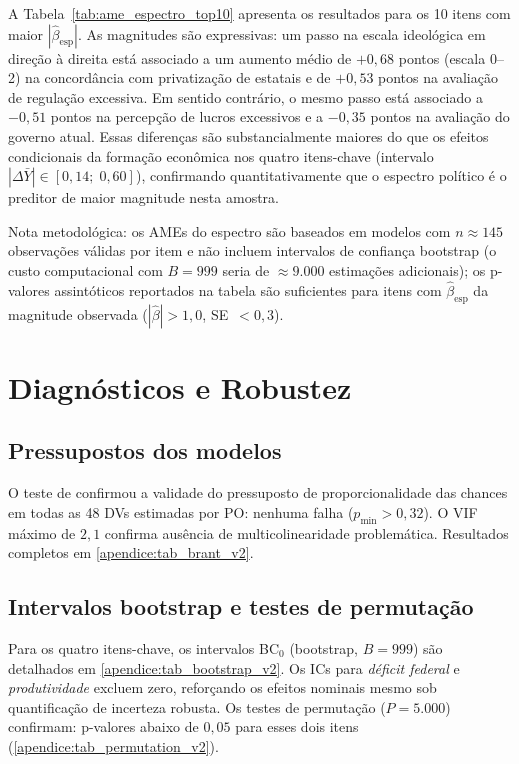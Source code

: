 A Tabela~\ref{tab:ame_espectro_top10} apresenta os resultados para os 10 itens com maior $|\hat{\beta}_{\text{esp}}|$. As magnitudes são expressivas: um passo na escala ideológica em direção à direita está associado a um aumento médio de $+0{,}68$ pontos (escala 0--2) na concordância com privatização de estatais e de $+0{,}53$ pontos na avaliação de regulação excessiva. Em sentido contrário, o mesmo passo está associado a $-0{,}51$ pontos na percepção de lucros excessivos e a $-0{,}35$ pontos na avaliação do governo atual. Essas diferenças são substancialmente maiores do que os efeitos condicionais da formação econômica nos quatro itens-chave (intervalo $|\Delta\bar{Y}| \in [0{,}14;\;0{,}60]$), confirmando quantitativamente que o espectro político é o preditor de maior magnitude nesta amostra.

Nota metodológica: os AMEs do espectro são baseados em modelos com $n\approx145$ observações válidas por item e não incluem intervalos de confiança bootstrap (o custo computacional com $B=999$ seria de $\approx 9.000$ estimações adicionais); os p-valores assintóticos reportados na tabela são suficientes para itens com $\hat{\beta}_{\text{esp}}$ da magnitude observada ($|\hat{\beta}|>1{,}0$, SE~$<0{,}3$).

\section{Diagnósticos e Robustez}
\label{sec:diagnosticos-resultados}

\subsection{Pressupostos dos modelos}

O teste de  confirmou a validade do pressuposto de proporcionalidade das chances em todas as 48 DVs estimadas por PO: nenhuma falha ($p_{\min} > 0{,}32$). O VIF máximo de $2{,}1$ confirma ausência de multicolinearidade problemática. Resultados completos em \autoref{apendice:tab_brant_v2}.

\subsection{Intervalos bootstrap e testes de permutação}

Para os quatro itens-chave, os intervalos BC$_0$ (bootstrap, $B=999$) são detalhados em \autoref{apendice:tab_bootstrap_v2}. Os ICs para \textit{déficit federal} e \textit{produtividade} excluem zero, reforçando os efeitos nominais mesmo sob quantificação de incerteza robusta. Os testes de permutação ($P = 5.000$) confirmam: p-valores abaixo de $0{,}05$ para esses dois itens (\autoref{apendice:tab_permutation_v2}).

